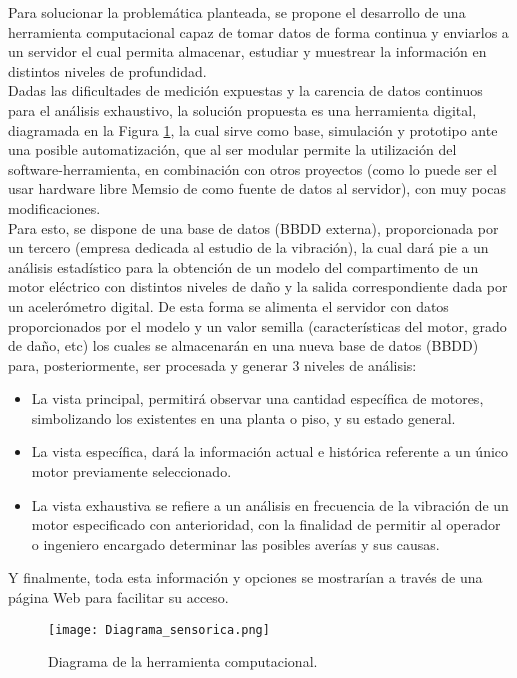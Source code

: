 

Para solucionar la problemática planteada, se propone el desarrollo de una herramienta computacional capaz de tomar datos de forma continua y enviarlos  a un servidor el cual permita  almacenar, estudiar y muestrear la información en distintos niveles de profundidad.\\


Dadas las dificultades de medición expuestas y la carencia de datos continuos para el análisis exhaustivo, la solución propuesta es una herramienta digital, diagramada en la Figura \ref{diagrama}, la cual sirve como base, simulación y prototipo ante  una posible automatización, que al ser modular permite la utilización del software-herramienta, en combinación con otros proyectos (como lo puede ser el usar hardware libre Memsio de \textcite{Koene} como fuente de datos al servidor), con muy pocas modificaciones.\\


Para esto, se dispone de una base de datos (BBDD externa), proporcionada por un tercero (empresa dedicada al estudio de la vibración), la cual dará pie a un análisis estadístico para la obtención de un modelo del compartimento de un motor eléctrico con distintos niveles de daño y la salida correspondiente dada por un acelerómetro digital. De esta forma se alimenta el servidor con datos proporcionados por el modelo y un valor semilla (características del motor, grado de daño, etc) los cuales se almacenarán en una nueva base de datos (BBDD) para, posteriormente, ser procesada y  generar 3 niveles de análisis: \\


\begin{itemize}
\item La vista principal, permitirá observar una cantidad específica de motores, simbolizando los existentes en una planta o piso, y su estado general.

\item La vista específica, dará la información actual e histórica referente a un único motor previamente seleccionado.

\item La vista exhaustiva se refiere a un análisis en frecuencia de la vibración de un motor especificado con anterioridad, con la finalidad de permitir al operador o ingeniero encargado determinar las posibles averías y sus causas.
\end{itemize}


Y finalmente, toda esta información y opciones se mostrarían a través de una página Web para facilitar su acceso.\\



\begin{figure}[htb]
\centering
\caption{Diagrama de la herramienta computacional.}
\label{diagrama}
\texttt{[image: Diagrama\_sensorica.png]}
\end{figure}
